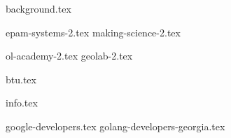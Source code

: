 \documentclass[11pt]{article}
\begin{document}
{background.tex}

{epam-systems-2.tex}
{making-science-2.tex}

{ol-academy-2.tex}
{geolab-2.tex}

{btu.tex}

{info.tex}

{google-developers.tex}
{golang-developers-georgia.tex}
\end{document}
